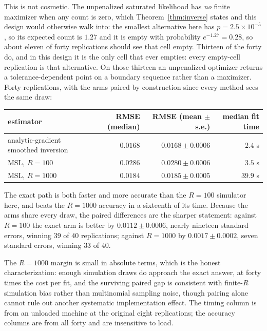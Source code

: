 \documentclass[11pt]{article}
\begin{document}
This is not cosmetic. The unpenalized saturated likelihood has \emph{no}
finite maximizer when any count is zero, which Theorem~\ref{thm:inverse}
states and this design would otherwise walk into: the smallest
alternative here has $p=2.5\times10^{-5}$, so its expected count is
$1.27$ and it is empty with probability $e^{-1.27}=0.28$, so about
eleven of forty replications should see that cell empty. Thirteen of the
forty do, and in this design it is the only cell that ever empties: every
empty-cell replication is that alternative. On those thirteen an
unpenalized optimizer returns a tolerance-dependent point on a boundary
sequence rather than a maximizer. Forty replications, with the arms paired by construction
since every method sees the same draw:

\begin{center}\small
\begin{tabular}{lrrr}
\toprule
estimator & RMSE (median) & RMSE (mean $\pm$ s.e.) & median fit time \\
\midrule
analytic-gradient smoothed inversion & $0.0168$ & $0.0168\pm0.0006$ & $2.4$ s \\
MSL, $R=100$ & $0.0286$ & $0.0280\pm0.0006$ & $3.5$ s \\
MSL, $R=1000$ & $0.0184$ & $0.0185\pm0.0005$ & $39.9$ s \\
\bottomrule
\end{tabular}
\end{center}

\noindent The exact path is both faster and more accurate than the
$R=100$ simulator here, and beats the $R=1000$ accuracy in a sixteenth
of its time. Because the arms share every draw, the paired differences
are the sharper statement: against $R=100$ the exact arm is better by
$0.0112\pm0.0006$, nearly nineteen standard errors, winning $39$ of $40$
replications; against $R=1000$ by $0.0017\pm0.0002$, seven standard
errors, winning $33$ of $40$.

The $R=1000$ margin is small in absolute terms, which is the honest
characterization: enough simulation draws do approach the exact answer,
at forty times the cost per fit, and the surviving paired gap is
consistent with finite-$R$ simulation bias rather than multinomial
sampling noise, though pairing alone cannot rule out another systematic
implementation effect. The timing column is from
an unloaded machine at the original eight replications; the accuracy
columns are from all forty and are insensitive to load.
\end{document}
